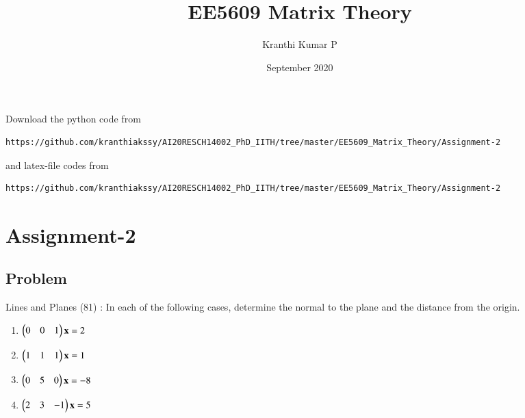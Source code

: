\documentclass[journal,12pt,twocolumn]{IEEEtran}
\begin{document}
     \def\rightbox#1{\makebox[0in][r]{#1}}
     \def\centbox#1{\makebox[0in]{#1}}
     \def\topbox#1{\raisebox{-\baselineskip}[0in][0in]{#1}}
     \def\midbox#1{\raisebox{-0.5\baselineskip}[0in][0in]{#1}}
\vspace{3cm}
\title{EE5609 Matrix Theory}
\author{Kranthi Kumar P}
\date{September 2020}
\maketitle
\newpage
\bigskip
\renewcommand{\thefigure}{\theenumi}
\renewcommand{\thetable}{\theenumi}
Download the python code from 
\begin{lstlisting}
https://github.com/kranthiakssy/AI20RESCH14002_PhD_IITH/tree/master/EE5609_Matrix_Theory/Assignment-2
\end{lstlisting}
%
and latex-file codes from 
%
\begin{lstlisting}
https://github.com/kranthiakssy/AI20RESCH14002_PhD_IITH/tree/master/EE5609_Matrix_Theory/Assignment-2
\end{lstlisting}
\section*{Assignment-2}
\subsection*{Problem}
Lines and Planes (81) : In each of the following cases, determine the normal to the plane and the distance from the origin.
\begin{enumerate}[label = (\alph*)]
\item $\begin{pmatrix}0&0&1\end{pmatrix}\mathbf{x} = 2 $
\item $\begin{pmatrix}1&1&1\end{pmatrix}\mathbf{x} = 1 $
\item $\begin{pmatrix}0&5&0\end{pmatrix}\mathbf{x} = -8 $
\item $\begin{pmatrix}2&3&-1\end{pmatrix}\mathbf{x} = 5 $
\end{enumerate}
\end{document}
